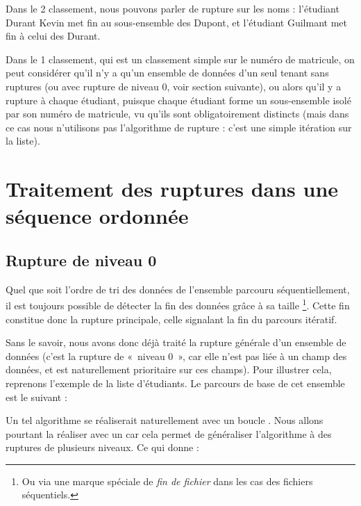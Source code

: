 	Dans le 2\ieme{} classement, nous pouvons parler de
	rupture sur les noms : l’étudiant Durant Kevin met fin au sous-ensemble
	des Dupont, et l’étudiant Guilmant met fin à celui des Durant.
		
	Dans le 1\ier{} classement, qui est un classement simple
	sur le numéro de matricule, on peut considérer qu’il n’y a qu’un
	ensemble de données d’un seul tenant sans ruptures (ou avec rupture de niveau 0, voir section suivante), ou alors qu’il y a
	rupture à chaque étudiant, puisque chaque étudiant forme un
	sous-ensemble isolé par son numéro de matricule, vu qu’ils sont
	obligatoirement distincts (mais dans ce cas nous n'utilisons pas 
        l'algorithme de rupture : c'est une simple itération sur la liste).
	
\section{Traitement des ruptures dans une séquence ordonnée}

\subsection*{Rupture de niveau 0}

	Quel que soit l’ordre de tri des données de l'ensemble parcouru séquentiellement, 
	il est toujours possible de détecter la fin des données grâce à sa taille%
	\footnote{%
		Ou via une marque spéciale de \emph{fin de fichier}
		dans les cas des fichiers séquentiels.
	}.
	Cette \og{}fin\fg{} constitue donc la rupture principale, 
	celle signalant la fin du parcours itératif.
	
	Sans le savoir, nous avons donc déjà traité la rupture générale d’un
	ensemble de données (c’est la rupture de «~niveau 0~»,
	car elle n’est pas liée à un champ des données, 
	et est naturellement prioritaire sur ces champs). 
	Pour illustrer cela, reprenons l’exemple de la liste d’étudiants. 
	Le parcours de base de cet ensemble est le suivant :

	\begin{algo}
	\end{algo}

	Un tel algorithme se réaliserait naturellement avec un boucle .
	Nous allons pourtant la réaliser avec un  car cela permet
	de généraliser l'algorithme à des ruptures de plusieurs niveaux.
	Ce qui donne :

